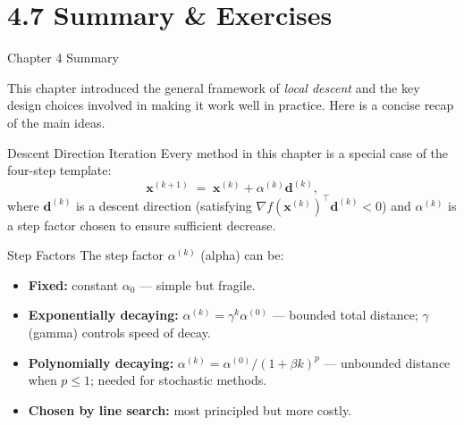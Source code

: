 \documentclass[aspectratio=169,10pt]{beamer}
\newcommand{\bx}{\mathbf{x}}
\newcommand{\bd}{\mathbf{d}}
\newcommand{\grad}{\nabla}
\begin{document}
\section{4.7 Summary \& Exercises}

\begin{frame}[allowframebreaks]{Chapter 4 Summary}

  This chapter introduced the general framework of \emph{local descent}
  and the key design choices involved in making it work well in practice.
  Here is a concise recap of the main ideas.

  \begin{block}{Descent Direction Iteration}
    Every method in this chapter is a special case of the four-step
    template:
    \[
      \bx^{(k+1)} \;=\; \bx^{(k)} + \alpha^{(k)}\bd^{(k)},
    \]
    where $\bd^{(k)}$ is a descent direction (satisfying
    $\grad f(\bx^{(k)})^{\top}\bd^{(k)} < 0$) and $\alpha^{(k)}$
    is a step factor chosen to ensure sufficient decrease.
  \end{block}

  \begin{block}{Step Factors}
    The step factor $\alpha^{(k)}$ (alpha) can be:
    \begin{itemize}
      \item \textbf{Fixed:} constant $\alpha_0$ --- simple but fragile.
      \item \textbf{Exponentially decaying:}
            $\alpha^{(k)} = \gamma^k \alpha^{(0)}$ --- bounded total
            distance; $\gamma$ (gamma) controls speed of decay.
      \item \textbf{Polynomially decaying:}
            $\alpha^{(k)} = \alpha^{(0)}/(1+\beta k)^p$ --- unbounded
            distance when $p \le 1$; needed for stochastic methods.
      \item \textbf{Chosen by line search:} most principled but more costly.
    \end{itemize}
  \end{block}

  \framebreak


\end{frame}
\end{document}
